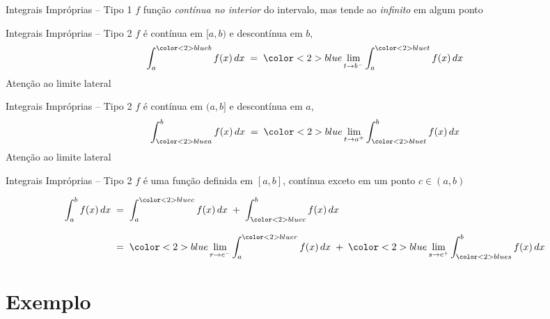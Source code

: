 \begin{frame}{Integrais Impróprias -- Tipo 1}
  $f$ função \emph{contínua no interior} do intervalo,
  mas tende ao \emph{infinito} em algum ponto
\end{frame}

\begin{frame}{Integrais Impróprias -- Tipo 2}
  $f$ é contínua em {\color{blue} $[a, b)$} e descontínua em $b$,
  {
  \large
  \[
    \int_{a}^{{\color<2>{blue} b}} f(x)\,dx
    \;=\;     {\color<2>{blue} \lim_{t\to b^{-}}}
    \int_{a}^{{\color<2>{blue} t}} f(x)\,dx
  \]}
  Atenção ao limite lateral
\end{frame}

\begin{frame}{Integrais Impróprias -- Tipo 2}
  $f$ é contínua em {\color{blue} $(a, b]$} e descontínua em $a$,
  {
  \large
  \[
    \int_{{\color<2>{blue} a}}^b f(x)\,dx
    \;=\; {\color<2>{blue} \lim_{t\to a^+}}
    \int_{{\color<2>{blue} t}}^b f(x)\,dx
  \]}
  Atenção ao limite lateral
\end{frame}

\begin{frame}{Integrais Impróprias -- Tipo 2}
  $f$ é uma função definida em $[a, b]$, contínua exceto em um ponto
  {\color{blue} $c \in (a, b)$}
  {
  \large
  \begin{align*}
      \int_a^b f(x) \, dx
    & \;=\; \int^{{\color<2>{blue} c}}_a f(x) \, dx
      \;+\; \int_{{\color<2>{blue} c}}^b f(x) \, dx \\[3mm]
    & \;=\; {\color<2>{blue} \lim_{r\to c^-}} \int^{{\color<2>{blue} r}}_a f(x) \, dx
      \;+\; {\color<2>{blue} \lim_{s\to c^+}} \int_{{\color<2>{blue} s}}^b f(x) \, dx
  \end{align*}

  }
\end{frame}

\section{Exemplo}

